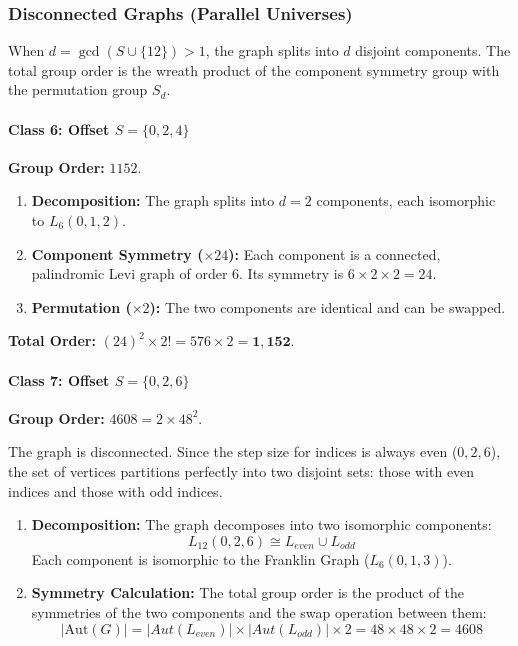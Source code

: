 \documentclass[12pt,letterpaper]{amsart}
\begin{document}
\subsubsection{Disconnected Graphs (Parallel Universes)}

When $d = \gcd(S \cup \{12\}) > 1$, the graph splits into $d$ disjoint components. The total group order is the wreath product of the component symmetry group with the permutation group $S_d$.

\paragraph{\bf Class 6: Offset $S = \{0, 2, 4\}$}


\textbf{Group Order:} $1152$.

\begin{enumerate}
    \item \textbf{Decomposition:} The graph splits into $d=2$ components, each isomorphic to $L_6(0, 1, 2)$.
    \item \textbf{Component Symmetry ($\times 24$):} Each component is a connected, palindromic Levi graph of order 6. Its symmetry is $6 \times 2 \times 2 = 24$.
    \item \textbf{Permutation ($\times 2$):} The two components are identical and can be swapped.
\end{enumerate}

\textbf{Total Order:} $(24)^2 \times 2! = 576 \times 2 = \mathbf{1,152}$.


\paragraph{\bf Class 7: Offset $S = \{0, 2, 6\}$}


\textbf{Group Order:} $4608 = 2 \times 48^2$.


The graph is disconnected. Since the step size for indices is always even ($0, 2, 6$), the set of vertices partitions perfectly into two disjoint sets: those with even indices and those with odd indices.

\begin{enumerate}
    \item \textbf{Decomposition:}
    The graph decomposes into two isomorphic components:
    $$ L_{12}(0,2,6) \cong L_{even} \cup L_{odd} $$
    Each component is isomorphic to the Franklin Graph ($L_6(0,1,3)$).

    \item \textbf{Symmetry Calculation:}
    The total group order is the product of the symmetries of the two components and the swap operation between them:
    $$ |\mathrm{Aut}(G)| = |Aut(L_{even})| \times |Aut(L_{odd})| \times 2 = 48 \times 48 \times 2 = 4608 $$
\end{enumerate}
\end{document}
